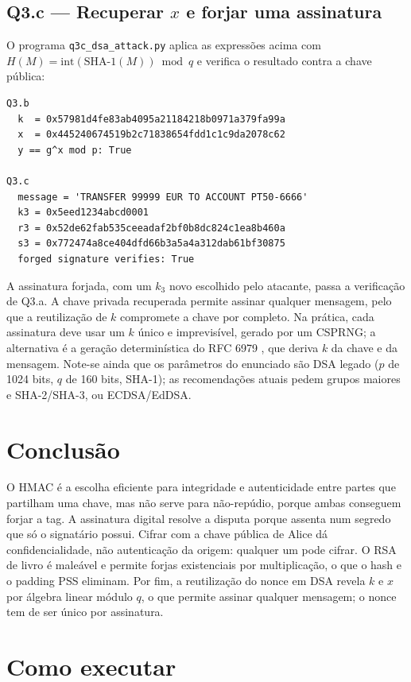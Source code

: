 \documentclass[11pt,a4paper]{article}
\begin{document}
\subsection*{Q3.c --- Recuperar $x$ e forjar uma assinatura}

O programa \texttt{q3c\_dsa\_attack.py} aplica as expressões acima com
$H(M) = \mathrm{int}(\mathrm{SHA\text{-}1}(M)) \bmod q$ e verifica o resultado
contra a chave pública:

\begin{verbatim}
Q3.b
  k  = 0x57981d4fe83ab4095a21184218b0971a379fa99a
  x  = 0x445240674519b2c71838654fdd1c1c9da2078c62
  y == g^x mod p: True

Q3.c
  message = 'TRANSFER 99999 EUR TO ACCOUNT PT50-6666'
  k3 = 0x5eed1234abcd0001
  r3 = 0x52de62fab535ceeadaf2bf0b8dc824c1ea8b460a
  s3 = 0x772474a8ce404dfd66b3a5a4a312dab61bf30875
  forged signature verifies: True
\end{verbatim}

A assinatura forjada, com um $k_3$ novo escolhido pelo atacante, passa a
verificação de Q3.a. A chave privada recuperada permite assinar qualquer
mensagem, pelo que a reutilização de $k$ compromete a chave por completo. Na
prática, cada assinatura deve usar um $k$ único e imprevisível, gerado por um
CSPRNG; a alternativa é a geração determinística do RFC 6979 \cite{rfc6979},
que deriva $k$ da chave e da mensagem. Note-se ainda que os parâmetros do
enunciado são DSA legado ($p$ de 1024 bits, $q$ de 160 bits, SHA-1); as
recomendações atuais pedem grupos maiores e SHA-2/SHA-3, ou ECDSA/EdDSA.

\section*{Conclusão}

O HMAC é a escolha eficiente para integridade e autenticidade entre partes que
partilham uma chave, mas não serve para não-repúdio, porque ambas conseguem
forjar a tag. A assinatura digital resolve a disputa porque assenta num segredo
que só o signatário possui. Cifrar com a chave pública de Alice dá
confidencialidade, não autenticação da origem: qualquer um pode cifrar. O RSA
de livro é maleável e permite forjas existenciais por multiplicação, o que o
hash e o padding PSS eliminam. Por fim, a reutilização do nonce em DSA revela
$k$ e $x$ por álgebra linear módulo $q$, o que permite assinar qualquer
mensagem; o nonce tem de ser único por assinatura.

\section*{Como executar}
\end{document}
